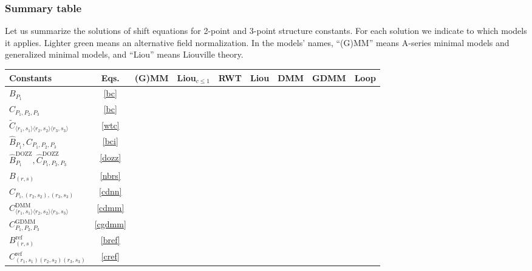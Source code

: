 \documentclass[12pt, a4paper]{article}
\theoremstyle{break}
\begin{document}
\subsubsection{Summary table}\label{sec:table}

Let us summarize the solutions of shift equations for 2-point and 3-point structure constants. For each solution we indicate to which models it applies. Lighter green means an alternative field normalization. In the models' names, ``(G)MM'' means A-series minimal models and generalized minimal models, and ``Liou'' means Liouville theory. 
\begin{center}
\begin{tabular}{|l|c|c|c|c|c|c|c|c|}
\hline 
 Constants & Eqs. & (G)MM & Liou$_{c\leq 1}$ & RWT & Liou & DMM & GDMM & Loop 
 \\
 \hline
  $B_{P_1}$ & \eqref{bc} & \cellcolor{green} & \cellcolor{green} & \cellcolor{green} &  & \cellcolor{green} & \cellcolor{green} & \cellcolor{green} 
  \\
  \hline 
  $C_{P_1,P_2,P_3}$& \eqref{bc} & \cellcolor{green} & \cellcolor{green} & \cellcolor{green} &  &  &  & \cellcolor{green} 
  \\
  \hline 
  $\widetilde{C}_{\langle r_1,s_1\rangle\langle r_2,s_2\rangle\langle r_3,s_3\rangle}$ & \eqref{wtc} & \cellcolor{green!20} & & & & & & 
  \\
  \hline 
  $\hat{B}_{P_1},\hat{C}_{P_1,P_2,P_3}$ &  \eqref{bci} & & & & \cellcolor{green} & & & 
  \\
  \hline 
  $\hat{B}^\text{DOZZ}_{P_1},\hat{C}^\text{DOZZ}_{P_1,P_2,P_3}$ & \eqref{dozz} & & & & \cellcolor{green!20} & & &
  \\
  \hline 
  $B_{(r,s)}$ & \eqref{nbrs} & & & & & \cellcolor{green} & \cellcolor{green} & 
  \\
  \hline 
  $C_{P_1,(r_2,s_2),(r_3,s_3)}$ & \eqref{cdnn} & & & & & \cellcolor{green} & \cellcolor{green} & 
  \\
  \hline 
  $C^\text{DMM}_{\langle r_1,s_1\rangle\langle r_2,s_2\rangle\langle r_3,s_3\rangle}$ & \eqref{cdmm} &
  & & & & \cellcolor{green} & & 
  \\
  \hline 
  $C^\text{GDMM}_{P_1,P_2,P_3}$ & \eqref{cgdmm} &
  & & & & & \cellcolor{green} & 
  \\
  \hline 
  $B^\text{ref}_{(r,s)}$ & \eqref{bref} & & & & & & & \cellcolor{green}
  \\
  \hline 
  $C^\text{ref}_{(r_1,s_1)(r_2,s_2)(r_3,s_3)}$ & \eqref{cref} & & & & & & & \cellcolor{green}
  \\
  \hline 
\end{tabular}
\end{center}
\end{document}
